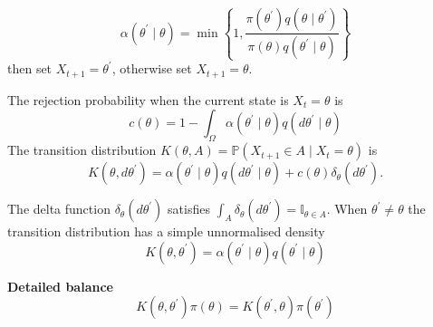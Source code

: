 \documentclass{article}
\begin{document}
$$
\alpha\left(\theta^{\prime} \mid \theta\right)=\min \left\{1, \frac{\pi\left(\theta^{\prime}\right) q\left(\theta \mid \theta^{\prime}\right)}{\pi(\theta) q\left(\theta^{\prime} \mid \theta\right)}\right\}
$$
then set $X_{t+1}=\theta^{\prime}$, otherwise set $X_{t+1}=\theta$.

The rejection probability when the current state is $X_t=\theta$ is
$$
c(\theta)=1-\int_{\Omega} \alpha\left(\theta^{\prime} \mid \theta\right) q\left(d \theta^{\prime} \mid \theta\right)
$$
The transition distribution $ K(\theta, A)=\mathbb{P}\left(X_{t+1} \in A \mid X_t=\theta\right) $ is
$$
K\left(\theta, d \theta^{\prime}\right)=\alpha\left(\theta^{\prime} \mid \theta\right) q\left(d \theta^{\prime} \mid \theta\right)+c(\theta) \delta_\theta\left(d \theta^{\prime}\right) .
$$

The delta function $\delta_\theta\left(d \theta^{\prime}\right)$ satisfies $\int_A \delta_\theta\left(d \theta^{\prime}\right)=\mathbb{I}_{\theta \in A}$.
When $\theta^{\prime} \neq \theta$ the transition distribution has a simple unnormalised density
$$
K\left(\theta, \theta^{\prime}\right)=\alpha\left(\theta^{\prime} \mid \theta\right) q\left(\theta^{\prime} \mid \theta\right)
$$

\textbf{Detailed balance} 
$$
K\left(\theta, \theta^{\prime}\right) \pi(\theta)=K\left(\theta^{\prime}, \theta\right) \pi\left(\theta^{\prime}\right)
$$
\end{document}
